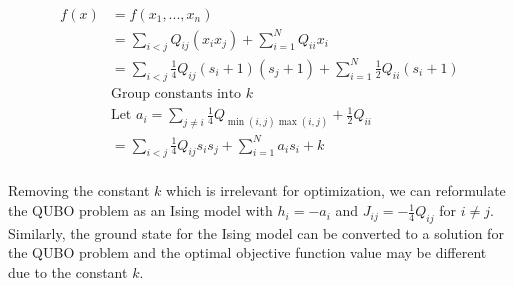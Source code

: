 \begin{align}
    f(x) &= f(x_1, ..., x_n) \nonumber\\
    &= \sum_{i < j} Q_{ij}(x_i x_j) + \sum_{i=1}^N Q_{ii} x_i \nonumber \\
    &= \sum_{i < j} \frac{1}{4} Q_{ij}(s_i + 1)(s_j + 1) + \sum_{i=1}^N \frac{1}{2} Q_{ii} (s_i + 1) \nonumber \\
    &\text{Group constants into $k$} \nonumber \\
    &\text{Let $a_i = \sum_{j \neq i} \frac{1}{4}Q_{\min(i,j)\max(i,j)} + \frac{1}{2}Q_{ii}$} \nonumber \\
    &= \sum_{i < j} \frac{1}{4} Q_{ij}s_i s_j + \sum_{i=1}^N a_i s_i + k \nonumber \\
\end{align}

Removing the constant $k$ which is irrelevant for optimization, we can reformulate the QUBO problem as an Ising model with $h_i = -a_i$ and $J_{ij} = -\frac{1}{4}Q_{ij}$ for $i \neq j$. Similarly, the ground state for the Ising model can be converted to a solution for the QUBO problem and the optimal objective function value may be different due to the constant $k$.